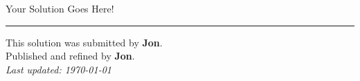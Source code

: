 ﻿\documentclass[12pt]{article}
\begin{document}
	
	Your Solution Goes Here!
	
	\newpage
	\hrule

	\begin{center}
		This solution was submitted by \textbf{Jon}.\\[4pt]
		Published and refined by \textbf{Jon}.\\[8pt]
		\textit{Last updated: \today}
	\end{center}
	
\end{document}
